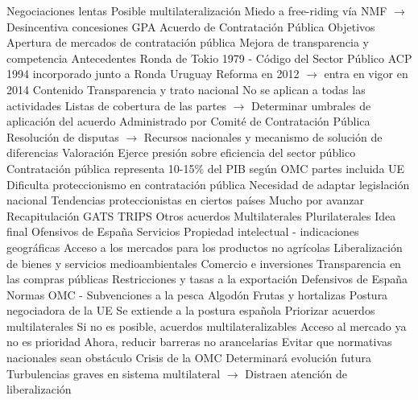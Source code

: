 \documentclass{nuevotema}
\begin{document}
\begin{esquemal}
				\4 Negociaciones lentas
				\4 Posible multilateralización
				\4[] Miedo a free-riding vía NMF
				\4[] $\to$ Desincentiva concesiones
			\3 GPA Acuerdo de Contratación Pública
				\4 Objetivos
				\4[] Apertura de mercados de contratación pública
				\4[] Mejora de transparencia y competencia
				\4 Antecedentes
				\4[] Ronda de Tokio 1979 - Código del Sector Público
				\4[] ACP 1994 incorporado junto a Ronda Uruguay
				\4[] Reforma en 2012
				\4[] $\to$ entra en vigor en 2014
				\4 Contenido
				\4[] Transparencia y trato nacional
				\4[] No se aplican a todas las actividades
				\4[] Listas de cobertura de las partes
				\4[] $\to$ Determinar umbrales de aplicación del acuerdo
				\4[] Administrado por Comité de Contratación Pública
				\4[] Resolución de disputas
				\4[] $\to$ Recursos nacionales y mecanismo de solución de diferencias
				\4 Valoración
				\4[] Ejerce presión sobre eficiencia del sector público
				\4[] Contratación pública representa 10-15\% del PIB según OMC
				 partes incluida UE
				\4[] Dificulta proteccionismo en contratación pública
				\4[] Necesidad de adaptar legislación nacional
				\4[] Tendencias proteccionistas en ciertos países
				\4[] Mucho por avanzar
	\1[] 
		\2 Recapitulación
			\3 GATS
			\3 TRIPS
			\3 Otros acuerdos
				\4 Multilaterales
				\4 Plurilaterales
		\2 Idea final
			\3 Ofensivos de España
				\4 Servicios
				\4 Propiedad intelectual - indicaciones geográficas
				\4 Acceso a los mercados para los productos no agrícolas
				\4 Liberalización de bienes y servicios medioambientales
				\4 Comercio e inversiones
				\4 Transparencia en las compras públicas
				\4 Restricciones y tasas a la exportación
			\3 Defensivos de España
				\4 Normas OMC - Subvenciones a la pesca
				\4 Algodón
				\4 Frutas y hortalizas
			\3 Postura negociadora de la UE
				\4 Se extiende a la postura española
				\4 Priorizar acuerdos multilaterales
				\4[] Si no es posible, acuerdos multilateralizables
				\4 Acceso al mercado ya no es prioridad
				\4[] Ahora, reducir barreras no arancelarias
				\4[] Evitar que normativas nacionales sean obstáculo
			\3 Crisis de la OMC
				\4 Determinará evolución futura
				\4 Turbulencias graves en sistema multilateral
				\4[] $\to$ Distraen atención de liberalización
\end{esquemal}
\end{document}
